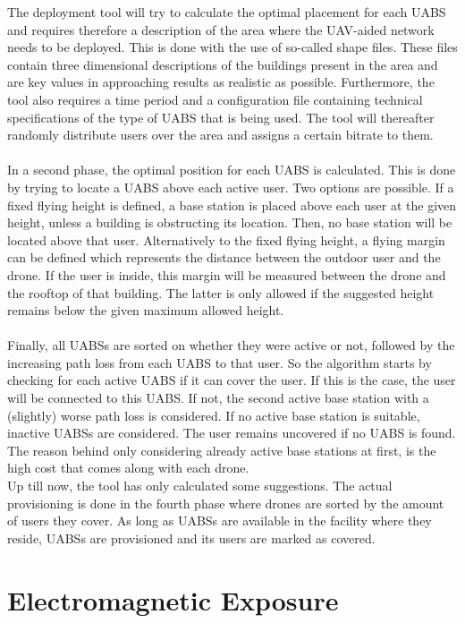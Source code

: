 The deployment tool will try to calculate the optimal placement for each \gls{UABS} and requires therefore a description of the area where the UAV-aided network needs to 
be deployed. This is done with the use of so-called shape files. These files contain three dimensional descriptions of the buildings present in the area and are
key values in approaching results as realistic as possible. Furthermore, the tool also requires a time period and a configuration file containing technical specifications of the type of \gls{UABS} that is being used. 
The tool will thereafter randomly distribute users over the area and assigns a certain bitrate to them. \\
\\
In a second phase, the optimal position for each \gls{UABS} is calculated. This is done by trying to locate a \gls{UABS} above each active user. Two options are possible.
If a fixed flying height is defined, a base station is placed above each user at the given height, unless a building is obstructing its location. Then, no base station will be located above that user.
Alternatively to the fixed flying height, a flying margin can be defined which represents the distance between the outdoor user and  the drone.
If the user is inside, this margin will be measured between the drone and the rooftop of that building.
The latter is only allowed if the suggested height remains below the given maximum allowed height. \\
\\
Finally, all \gls{UABS}s are sorted on whether they were active or not, followed by the increasing path loss from each \gls{UABS} to that user.
So the algorithm starts by checking for each active \gls{UABS} if it can cover the user. If this is the case, the user will be connected to this \gls{UABS}. If not,
the second active base station with a (slightly) worse path loss is considered. If no active base station is suitable, inactive \gls{UABS}s are considered. 
The user remains uncovered if no \gls{UABS}
is found. The reason behind only considering already active base stations at first, is the high cost that comes along with each drone.
\\
Up till now, the tool has only calculated some suggestions. The actual provisioning is done in the fourth phase where drones are sorted by the amount of users they cover. As long as \gls{UABS}s
are available in the facility where they reside, \gls{UABS}s are provisioned and its users are marked as covered.


\section{Electromagnetic Exposure}

